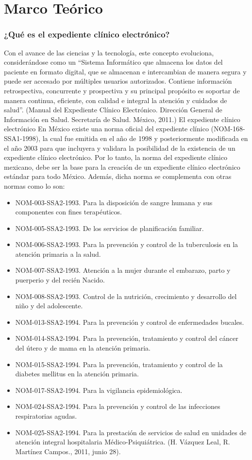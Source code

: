 \chapter{Marco Teórico}

\subsection{¿Qué es el expediente clínico electrónico?}

Con el avance de las ciencias y la tecnología, este concepto evoluciona, considerándose como un “Sistema Informático que almacena los datos del paciente en formato digital, que se almacenan e intercambian de manera segura y puede ser accesado por múltiples usuarios autorizados. Contiene información retrospectiva, concurrente y prospectiva y su principal propósito es soportar de manera continua, eficiente, con calidad e integral la atención y cuidados de salud”. (Manual del Expediente Clínico Electrónico. Dirección General de Información en Salud. Secretaría de Salud. México, 2011.)
El expediente clínico electrónico
En México existe una norma oficial del expediente clínico (NOM-168-SSA1-1998), la cual fue emitida en el año de 1998 y posteriormente modificada en el año 2003 para que incluyera y validara la posibilidad de la existencia de un expediente clínico electrónico. Por lo tanto, la norma del expediente clínico mexicano, debe ser la base para la creación de un expediente clínico electrónico estándar para todo México. Además, dicha norma se complementa con otras normas como lo son:
\begin{itemize}
  \item NOM-003-SSA2-1993. Para la disposición de sangre humana y sus componentes con fines terapéuticos.
  \item NOM-005-SSA2-1993. De los servicios de planificación familiar.
  \item NOM-006-SSA2-1993. Para la prevención y control de la tuberculosis en la atención primaria a la salud.
  \item NOM-007-SSA2-1993. Atención a la mujer durante el embarazo, parto y puerperio y del recién Nacido.
  \item NOM-008-SSA2-1993. Control de la nutrición, crecimiento y desarrollo del niño y del adolescente.
  \item NOM-013-SSA2-1994. Para la prevención y control de enfermedades bucales.
  \item NOM-014-SSA2-1994. Para la prevención, tratamiento y control del cáncer del útero y de mama en la atención primaria.
  \item NOM-015-SSA2-1994. Para la prevención, tratamiento y control de la diabetes mellitus en la atención primaria.
  \item NOM-017-SSA2-1994. Para la vigilancia epidemiológica.
  \item NOM-024-SSA2-1994. Para la prevención y control de las infecciones respiratorias agudas.
  \item NOM-025-SSA2-1994. Para la prestación de servicios de salud en unidades de atención integral hospitalaria Médico-Psiquiátrica. (H. Vázquez Leal, R. Martínez Campos., 2011, junio 28).

\end{itemize}

